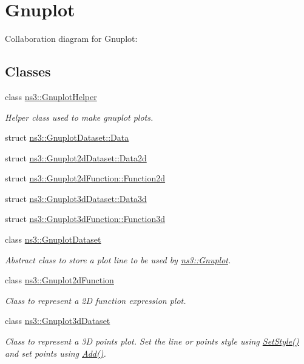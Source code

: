 \hypertarget{group__gnuplot}{}\section{Gnuplot}
\label{group__gnuplot}
Collaboration diagram for Gnuplot\+:
\subsection*{Classes}
\begin{DoxyCompactItemize}
\item 
class \hyperlink{classns3_1_1GnuplotHelper}{ns3\+::\+Gnuplot\+Helper}
\begin{DoxyCompactList}\small\item\em Helper class used to make gnuplot plots. \end{DoxyCompactList}\item 
struct \hyperlink{structns3_1_1GnuplotDataset_1_1Data}{ns3\+::\+Gnuplot\+Dataset\+::\+Data}
\item 
struct \hyperlink{structns3_1_1Gnuplot2dDataset_1_1Data2d}{ns3\+::\+Gnuplot2d\+Dataset\+::\+Data2d}
\item 
struct \hyperlink{structns3_1_1Gnuplot2dFunction_1_1Function2d}{ns3\+::\+Gnuplot2d\+Function\+::\+Function2d}
\item 
struct \hyperlink{structns3_1_1Gnuplot3dDataset_1_1Data3d}{ns3\+::\+Gnuplot3d\+Dataset\+::\+Data3d}
\item 
struct \hyperlink{structns3_1_1Gnuplot3dFunction_1_1Function3d}{ns3\+::\+Gnuplot3d\+Function\+::\+Function3d}
\item 
class \hyperlink{classns3_1_1GnuplotDataset}{ns3\+::\+Gnuplot\+Dataset}
\begin{DoxyCompactList}\small\item\em Abstract class to store a plot line to be used by \hyperlink{classns3_1_1Gnuplot}{ns3\+::\+Gnuplot}. \end{DoxyCompactList}\item 
class \hyperlink{classns3_1_1Gnuplot2dFunction}{ns3\+::\+Gnuplot2d\+Function}
\begin{DoxyCompactList}\small\item\em Class to represent a 2D function expression plot. \end{DoxyCompactList}\item 
class \hyperlink{classns3_1_1Gnuplot3dDataset}{ns3\+::\+Gnuplot3d\+Dataset}
\begin{DoxyCompactList}\small\item\em Class to represent a 3D points plot. Set the line or points style using \hyperlink{classns3_1_1Gnuplot3dDataset_ae99331e66e6d5a39fdf407875be56f1f}{Set\+Style()} and set points using \hyperlink{classns3_1_1Gnuplot3dDataset_ad3a4b4baa637cfc099a488f3fcbf1975}{Add()}. \end{DoxyCompactList}\item 

\end{DoxyCompactItemize}
